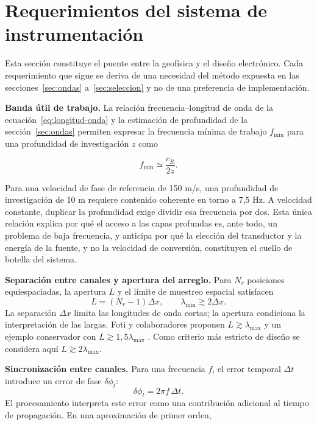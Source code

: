 \section{Requerimientos del sistema de instrumentación}
\label{sec:requerimientos}

Esta sección constituye el puente entre la geofísica y el diseño electrónico. Cada requerimiento que sigue se deriva de una necesidad del método expuesta en las secciones~\ref{sec:ondas} a~\ref{sec:seleccion} y no de una preferencia de implementación.

\textbf{Banda útil de trabajo.} La relación frecuencia--longitud de onda de la ecuación~\eqref{eq:longitud-onda} y la estimación de profundidad de la sección~\ref{sec:ondas} permiten expresar la frecuencia mínima de trabajo $f_{\min}$ para una profundidad de investigación $z$ como

\begin{equation}
f_{\min}\simeq\frac{c_R}{2z}.
\end{equation}

Para una velocidad de fase de referencia de 150 m/s, una profundidad de investigación de 10 m requiere contenido coherente en torno a 7,5 Hz. A velocidad constante, duplicar la profundidad exige dividir esa frecuencia por dos. Esta única relación explica por qué el acceso a las capas profundas es, ante todo, un problema de baja frecuencia, y anticipa por qué la elección del transductor y la energía de la fuente, y no la velocidad de conversión, constituyen el cuello de botella del sistema.

\textbf{Separación entre canales y apertura del arreglo.} Para $N_r$ posiciones equiespaciadas, la apertura $L$ y el límite de muestreo espacial satisfacen
\begin{equation}
L=(N_r-1)\Delta x,\qquad
\lambda_{\min}\gtrsim2\Delta x.
\label{eq:geometria-arreglo}
\end{equation}
La separación $\Delta x$ limita las longitudes de onda cortas; la apertura condiciona la interpretación de las largas. Foti y colaboradores proponen $L\gtrsim\lambda_{\max}$ y un ejemplo conservador con $L\gtrsim1{,}5\lambda_{\max}$ \citep{Foti2018}. Como criterio más estricto de diseño se considera aquí $L\gtrsim2\lambda_{\max}$.

\textbf{Sincronización entre canales.} Para una frecuencia $f$, el error temporal $\Delta t$ introduce un error de fase $\delta\phi_t$:
\begin{equation}
\delta\phi_t=2\pi f\,\Delta t.
\label{eq:error-fase-temporal}
\end{equation}
 El procesamiento interpreta este error como una contribución adicional al tiempo de propagación. En una aproximación de primer orden,

